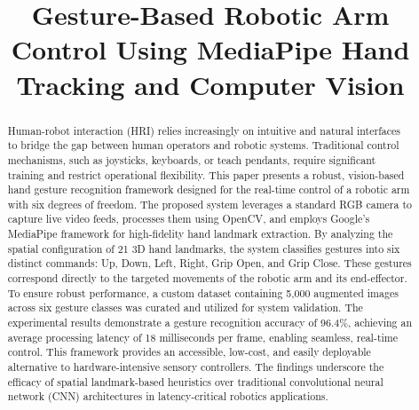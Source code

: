 \documentclass[conference]{IEEEtran}
\begin{document}
\title{Gesture-Based Robotic Arm Control Using MediaPipe Hand Tracking and Computer Vision\\
}

\author{
\and
{}
\and
{}
}

\maketitle

\begin{abstract}
Human-robot interaction (HRI) relies increasingly on intuitive and natural interfaces to bridge the gap between human operators and robotic systems. Traditional control mechanisms, such as joysticks, keyboards, or teach pendants, require significant training and restrict operational flexibility. This paper presents a robust, vision-based hand gesture recognition framework designed for the real-time control of a robotic arm with six degrees of freedom. The proposed system leverages a standard RGB camera to capture live video feeds, processes them using OpenCV, and employs Google's MediaPipe framework for high-fidelity hand landmark extraction. By analyzing the spatial configuration of 21 3D hand landmarks, the system classifies gestures into six distinct commands: Up, Down, Left, Right, Grip Open, and Grip Close. These gestures correspond directly to the targeted movements of the robotic arm and its end-effector. To ensure robust performance, a custom dataset containing 5,000 augmented images across six gesture classes was curated and utilized for system validation. The experimental results demonstrate a gesture recognition accuracy of 96.4\%, achieving an average processing latency of 18 milliseconds per frame, enabling seamless, real-time control. This framework provides an accessible, low-cost, and easily deployable alternative to hardware-intensive sensory controllers. The findings underscore the efficacy of spatial landmark-based heuristics over traditional convolutional neural network (CNN) architectures in latency-critical robotics applications.
\end{abstract}
\end{document}
